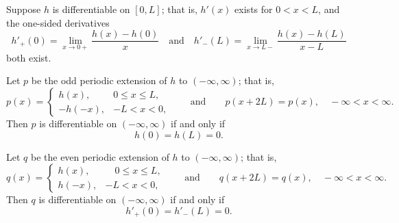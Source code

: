 \begin{theorem}\label{thmtype:12.2.3}
Suppose $h$ is differentiable on $[0,L]$; that is,
$h'(x)$ exists for $0<x<L$, and the one-sided derivatives
\[
h'_+(0)=\lim_{x\to0+}\frac{h(x)-h(0)}{x}
\quad\text{and}\quad
h'_-(L)=\lim_{x\to L-}\frac{h(x)-h(L)}{x-L}
\]
both exist.

\begin{alist}
\item
Let $p$ be the odd periodic extension of $h$ to $(-\infty,\infty)$;
that is,
\[
p(x)=
\begin{cases}
h(x),&0\le x\le L,\\
-h(-x),&-L<x<0,
\end{cases}
\qquad\text{and}\qquad
p(x+2L)=p(x),\quad -\infty<x<\infty.
\]
Then $p$ is differentiable on $(-\infty,\infty)$ if and only
if
\begin{equation} \label{eq:12.2.13}
h(0)=h(L)=0.
\end{equation}

\item
Let $q$ be the even periodic extension of $h$ to $(-\infty,\infty)$;
that is,
\[
q(x)=
\begin{cases}
h(x),&\quad 0\le x\le L,\\
h(-x),&-L<x<0,
\end{cases}
\qquad\text{and}\qquad q(x+2L)=q(x),\quad -\infty<x<\infty.
\]
Then $q$ is differentiable on $(-\infty,\infty)$ if and only
if
\begin{equation} \label{eq:12.2.14}
h'_+(0)=h'_-(L)=0.
\end{equation}
\end{alist}
\end{theorem}

